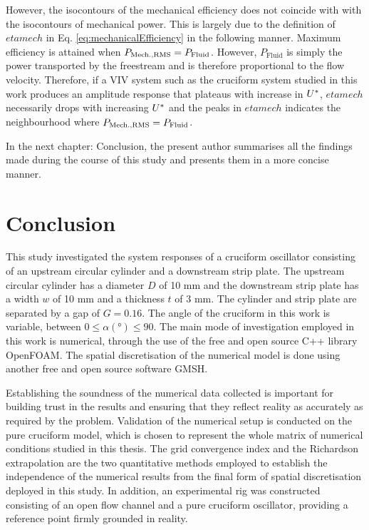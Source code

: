 \documentclass[oneside]{utmthesis}
\begin{document}
However, the isocontours of the mechanical efficiency does not coincide with with the isocontours of mechanical power. This is largely due to the definition of $etamech$ in Eq. \ref{eq:mechanicalEfficiency} in the following manner. Maximum efficiency is attained when $P_{\text{Mech.,RMS}} = P_{\text{Fluid}}$. However, $P_{\text{Fluid}}$ is simply the power transported by the freestream and is therefore proportional to the flow velocity. Therefore, if a VIV system such as the cruciform system studied in this work produces an amplitude response that plateaus with increase in $U^{*}$, $etamech$ necessarily drops with increasing $U^{*}$ and the peaks in $etamech$ indicates the neighbourhood where $P_{\text{Mech.,RMS}} = P_{\text{Fluid}}$.

In the next chapter: Conclusion, the present author summarises all the findings made during the course of this study and presents them in a more concise manner.

\chapter{Conclusion} \label{chap:conclusion}
This study investigated the system responses of a cruciform oscillator consisting of an upstream circular cylinder and a downstream strip plate. The upstream circular cylinder has a diameter $D$ of 10 mm and the downstream strip plate has a width $w$ of 10 mm and a thickness $t$ of 3 mm.  The cylinder and strip plate are separated by a gap of $G = 0.16$. The angle of the cruciform in this work is variable, between $0 \leq \alpha (\si{\degree}) \leq 90$. The main mode of investigation employed in this work is numerical, through the use of the free and open source C++ library OpenFOAM. The spatial discretisation of the numerical model is done using another free and open source software GMSH.

Establishing the soundness of the numerical data collected is important for building trust in the results and ensuring that they reflect reality as accurately as required by the problem. Validation of the numerical setup is conducted on the pure cruciform model, which is chosen to represent the whole matrix of numerical conditions studied in this thesis. The grid convergence index and the Richardson extrapolation are the two quantitative methods employed to establish the independence of the numerical results from the final form of spatial discretisation deployed in this study. In addition, an experimental rig was constructed consisting of an open flow channel and a pure cruciform oscillator, providing a reference point firmly grounded in reality.
\end{document}
